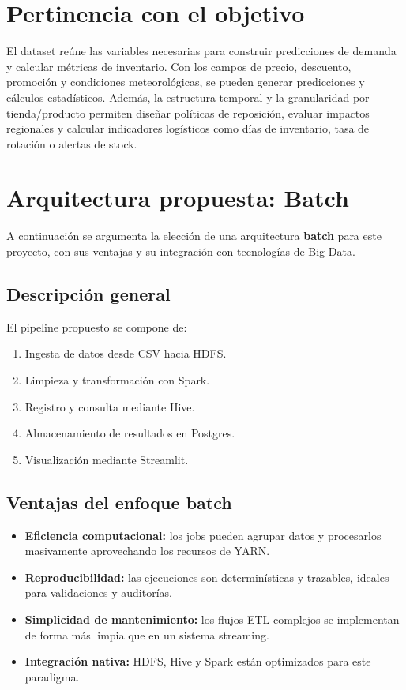 \documentclass[12pt,a4paper]{article}
\begin{document}
	\section{Pertinencia con el objetivo}
	El dataset reúne las variables necesarias para construir predicciones de demanda y calcular métricas de inventario. Con los campos de precio, descuento, promoción y condiciones meteorológicas, se pueden generar predicciones y cálculos estadísticos. Además, la estructura temporal y la granularidad por tienda/producto permiten diseñar políticas de reposición, evaluar impactos regionales y calcular indicadores logísticos como días de inventario, tasa de rotación o alertas de stock.
	
	\section{Arquitectura propuesta: \textbf{Batch}}
	A continuación se argumenta la elección de una arquitectura \textbf{batch} para este proyecto, con sus ventajas y su integración con tecnologías de Big Data.
	
	\subsection{Descripción general}
	El pipeline propuesto se compone de:
	\begin{enumerate}
		\item Ingesta de datos desde CSV hacia HDFS.
		\item Limpieza y transformación con Spark.
		\item Registro y consulta mediante Hive.
		\item Almacenamiento de resultados en Postgres.
		\item Visualización mediante Streamlit.
	\end{enumerate}
	
	\subsection{Ventajas del enfoque batch}
	\begin{itemize}
		\item \textbf{Eficiencia computacional:} los jobs pueden agrupar datos y procesarlos masivamente aprovechando los recursos de YARN.
		\item \textbf{Reproducibilidad:} las ejecuciones son determinísticas y trazables, ideales para validaciones y auditorías.
		\item \textbf{Simplicidad de mantenimiento:} los flujos ETL complejos se implementan de forma más limpia que en un sistema streaming.
		\item \textbf{Integración nativa:} HDFS, Hive y Spark están optimizados para este paradigma.
	\end{itemize}
	
\end{document}
